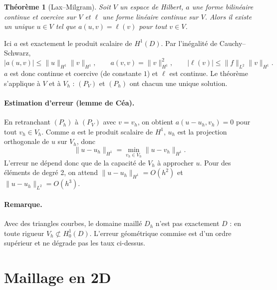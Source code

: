 \documentclass[11pt,a4paper]{article}
\newtheorem*{theoreme}{Théorème}
\begin{document}
\begin{theoreme}[Lax--Milgram]
Soit $V$ un espace de Hilbert, $a$ une forme bilinéaire continue et
coercive sur $V$ et $\ell$ une forme linéaire continue sur $V$. Alors il
existe un unique $u \in V$ tel que $a(u,v) = \ell(v)$ pour tout $v \in V$.
\end{theoreme}

Ici $a$ est exactement le produit scalaire de $H^1(D)$. Par l'inégalité de
Cauchy--Schwarz,
\[
|a(u,v)| \le \|u\|_{H^1} \|v\|_{H^1},
\qquad
a(v,v) = \|v\|_{H^1}^2,
\qquad
|\ell(v)| \le \|f\|_{L^2} \|v\|_{H^1} .
\]
$a$ est donc continue et coercive (de constante $1$) et $\ell$ est continue.
Le théorème s'applique à $V$ et à $V_h$ : $(P_V)$ et $(P_h)$ ont chacun une
unique solution.

\paragraph{Estimation d'erreur (lemme de Céa).} En retranchant $(P_h)$ à
$(P_V)$ avec $v = v_h$, on obtient $a(u - u_h, v_h) = 0$ pour tout
$v_h \in V_h$. Comme $a$ est le produit scalaire de $H^1$, $u_h$ est la
projection orthogonale de $u$ sur $V_h$, donc
\[
\|u - u_h\|_{H^1} = \min_{v_h \in V_h} \|u - v_h\|_{H^1} .
\]
L'erreur ne dépend donc que de la capacité de $V_h$ à approcher $u$. Pour
des éléments de degré 2, on attend $\|u - u_h\|_{H^1} = O(h^2)$ et
$\|u - u_h\|_{L^2} = O(h^3)$.

\paragraph{Remarque.} Avec des triangles courbes, le domaine maillé $D_h$
n'est pas exactement $D$ : en toute rigueur $V_h \not\subset H^1_0(D)$.
L'erreur géométrique commise est d'un ordre supérieur et ne dégrade pas les
taux ci-dessus.


\section{Maillage en 2D}
\end{document}
